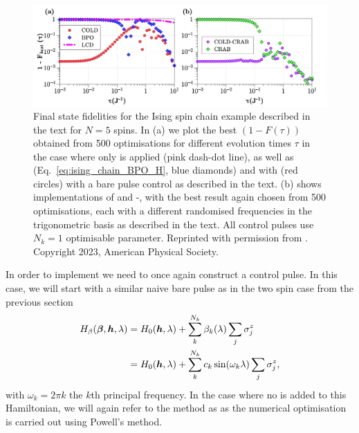 \begin{figure}[t]
    \centering
    \includegraphics[width=\linewidth]{images/IsingUnconstrained.jpg} \caption[Applying COLD and COLD-CRAB to the Ising chain for 5 spins without constraints on the driving amplitudes.]{Final state fidelities for the Ising spin chain example described in the text for $N=5$ spins. In (a) we plot the best $(1 - F(\tau))$ obtained from 500 optimisations for different evolution times $\tau$ in the case where only   is applied (pink dash-dot line), as well as  (Eq.~\eqref{eq:ising_chain_BPO_H}, blue diamonds) and  with   (red circles) with a bare pulse control as described in the text. (b) shows implementations of  and -, with the best result again chosen from 500 optimisations, each with a different randomised frequencies in the trigonometric basis as described in the text. All control pulses use $N_k = 1$ optimisable parameter. Reprinted with permission from \cite{cepaite_counterdiabatic_2023}. Copyright 2023, American Physical Society.} \label{fig:ising_unconstrained}
\end{figure}

In order to implement  we need to once again construct a control pulse. In this case, we will start with a similar naive bare pulse as in the two spin case from the previous section
\begin{equation}\label{eq:ising_chain_BPO_H}
    \begin{aligned}
        H_{\beta}(\boldsymbol{\beta}, \boldsymbol{h}, \lambda) &= H_0(\boldsymbol{h}, \lambda) + \sum_k^{N_k} \beta_k(\lambda) \sum_j \sigma^z_j \\
        &= H_0(\boldsymbol{h}, \lambda) + \sum_k^{N_k} c_k \sin(\omega_k \lambda) \sum_j \sigma^z_j,
    \end{aligned}
\end{equation}
with $\omega_k = 2\pi k$ the $k$th principal frequency. In the case where no  is added to this Hamiltonian, we will again refer to the method as  as the numerical optimisation is carried out using Powell's method.

